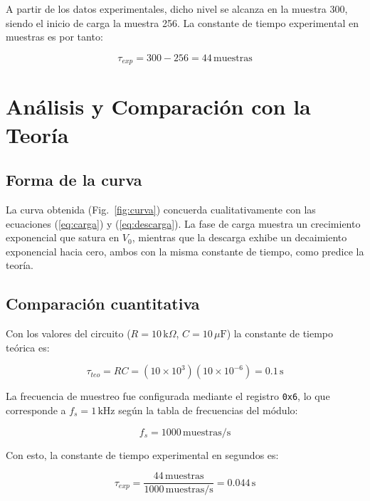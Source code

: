 \documentclass[conference]{IEEEtran}
\begin{document}
A partir de los datos experimentales, dicho nivel se alcanza en la
muestra 300, siendo el inicio de carga la muestra 256. La constante de
tiempo experimental en muestras es por tanto:

\begin{equation}
    \tau_{exp} = 300 - 256 = 44\,\text{muestras}
\end{equation}

\section{Análisis y Comparación con la Teoría}

\subsection{Forma de la curva}

La curva obtenida (Fig.~\ref{fig:curva}) concuerda cualitativamente con las ecuaciones (\ref{eq:carga}) y (\ref{eq:descarga}). La fase de carga muestra un crecimiento exponencial que satura en $V_0$, mientras que la descarga exhibe un decaimiento exponencial hacia cero, ambos con la misma constante de tiempo, como predice la teoría.

\subsection{Comparación cuantitativa}

Con los valores del circuito ($R = 10\,\text{k}\Omega$,
$C = 10\,\mu\text{F}$) la constante de tiempo teórica es:

\begin{equation}
    \tau_{teo} = RC = (10\times10^3)(10\times10^{-6}) = 0.1\,\text{s}
    \label{eq:tau_teo}
\end{equation}

La frecuencia de muestreo fue configurada mediante el registro
\texttt{0x6}, lo que corresponde a $f_s = 1\,\text{kHz}$ según la
tabla de frecuencias del módulo:

\begin{equation}
    f_s = 1000\,\text{muestras/s}
    \label{eq:fs}
\end{equation}

Con esto, la constante de tiempo experimental en segundos es:

\begin{equation}
    \tau_{exp} = \frac{44\,\text{muestras}}{1000\,\text{muestras/s}}
               = 0.044\,\text{s}
    \label{eq:tau_exp}
\end{equation}
\end{document}

